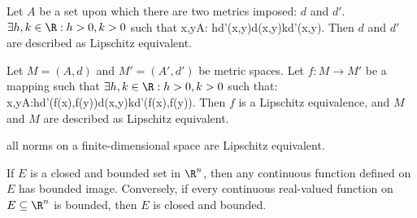 \begin{definition}\label{def:metrics_lipschitz_equivalence_metop}
Let $A$ be a set upon which there are two metrics imposed: $d$ and $d'$. $\exists h,k \in \R: h>0,k>0$ such that
\be
\forall x,y\in A: \quad hd'(x,y)\leq d(x,y)\leq kd'(x,y).
\ee
Then $d$ and $d'$ are described as Lipschitz equivalent.
\end{definition}

\begin{definition}\label{def:metrics_space_lipschitz_equivalence_metop}
Let $M=(A,d)$ and $M'=(A',d')$ be metric spaces. Let $f:M\to M'$ be a mapping such that $\exists h,k\in\R:h>0,k>0$ such that:
\be
\forall x,y\in A:hd'(f(x),f(y))\leq d(x,y)\leq kd'(f(x),f(y)).
\ee
Then $f$ is a Lipschitz equivalence, and $M$ and $M$ are described as Lipschitz equivalent.
\end{definition}

\begin{remark}
all norms on a finite-dimensional space are Lipschitz equivalent.
\end{remark}




\begin{remark}
If $E$ is a closed and bounded set in $\R^n$, then any continuous function defined on $E$ has bounded image. Conversely, if every continuous real-valued function on $E\subseteq \R^n$ is bounded, then $E$ is closed and bounded.
\end{remark}


